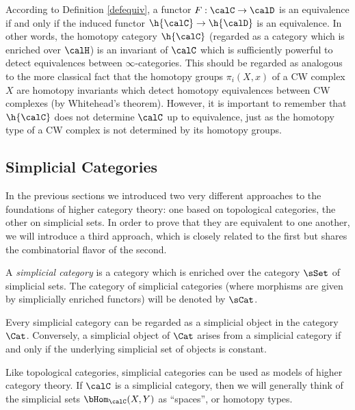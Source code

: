 \begin{remark}
According to Definition \ref{defequiv}, a functor $F: \calC \rightarrow \calD$ is an equivalence if and only if the induced functor $\h{\calC} \rightarrow \h{ \calD}$ is an equivalence. In other words, the homotopy category $\h{\calC}$ (regarded as a category which is enriched over $\calH$) is an invariant of $\calC$
which is sufficiently powerful to detect equivalences between $\infty$-categories.
This should be regarded as analogous to the more classical fact that the homotopy groups $\pi_i(X,x)$ of a CW complex $X$ are homotopy invariants which detect homotopy equivalences between CW complexes (by Whitehead's theorem). However, it is important to remember that $\h{ \calC}$ does not determine $\calC$ up to equivalence, just as the homotopy type of a CW complex is not determined by its homotopy groups.
\end{remark}

\subsection{Simplicial Categories}\label{compp1}

In the previous sections we introduced two very different approaches to the foundations of higher category theory: one based on topological categories, the other on simplicial sets. In order to prove that they are equivalent to one another, we will introduce a third approach,  which is closely related to the first but shares the combinatorial flavor of the second.

\begin{definition}
A {\it simplicial category} is a category which is enriched over
the category $\sSet$ of simplicial sets. The category of simplicial
categories (where morphisms are given by simplicially enriched functors) will be
denoted by $\sCat$.
\end{definition}

\begin{remark}
Every simplicial category can be regarded as a simplicial object in the category $\Cat$. Conversely, a simplicial object of $\Cat$ arises from a simplicial category if and only if the underlying simplicial set of objects is constant.
\end{remark}

Like topological categories, simplicial categories can be used as models of higher category theory. If $\calC$ is a simplicial category, then we will generally think of the simplicial sets $\bHom_{\calC}(X,Y)$ as ``spaces'', or homotopy types. 

